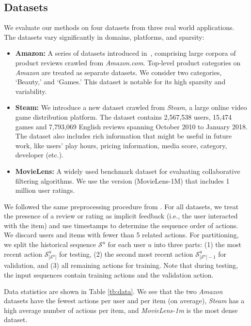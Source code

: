 \documentclass[conference]{IEEEtran}
\begin{document}
\subsection{Datasets}




We evaluate our methods on four datasets from three real world applications. The datasets 
vary
significantly in domains, platforms, and sparsity: 
\begin{itemize}
\item \textbf{Amazon:} A series of datasets introduced in~\cite{VisualSIGIR}, comprising large corpora of product reviews crawled from \emph{Amazon.com}. Top-level product categories on \emph{Amazon} are treated as separate datasets. We consider two categories, `Beauty,' and `Games.' This dataset is notable for its high sparsity and variability.
\item \textbf{Steam:} We introduce a new dataset crawled from \emph{Steam}, a large online video game distribution platform. The dataset contains 2,567,538 users, 15,474 games and 7,793,069 English reviews spanning October 2010 to January 2018. The dataset also includes rich information that might be useful in future work, like 
users'
play hours, pricing information, media score, category, developer (etc.).
\item \textbf{MovieLens:} A widely used benchmark dataset for evaluating collaborative filtering algorithms. We use the version (MovieLens-1M) that includes 1 million user ratings.
\end{itemize}

We followed the same preprocessing procedure from \cite{DBLP:conf/recsys/HeKM17,DBLP:conf/icdm/HeM16,rendle2010fpmc}. For all datasets, we treat the presence of a review or rating as implicit feedback (i.e., the user interacted with the item) and use timestamps to determine the sequence order of actions. We discard users and items with fewer than 5 related actions. For partitioning, we split the historical sequence $\mathcal{S}^u$ for each user $u$ into three parts: (1) the most recent action $\mathcal{S}^u_{|\mathcal{S}^u|}$ for testing, (2) the second most recent action $\mathcal{S}^u_{|\mathcal{S}^u|-1}$ for validation, and (3) all remaining actions for training. Note that during testing, the input sequences contain training actions and the validation action.

Data statistics are shown in Table \ref{tb:data}.
We 
see that the two \emph{Amazon} datasets have the 
fewest
actions per user and per item (on average), \emph{Steam} has a high average number of actions per item, and \emph{MovieLens-1m} is the most dense dataset.
\end{document}
